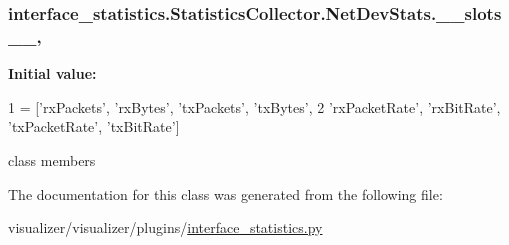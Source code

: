 \subsubsection[{\texorpdfstring{\+\_\+\+\_\+slots\+\_\+\+\_\+}{__slots__}}]{\setlength{\rightskip}{0pt plus 5cm}interface\+\_\+statistics.\+Statistics\+Collector.\+Net\+Dev\+Stats.\+\_\+\+\_\+slots\+\_\+\+\_\+\hspace{0.3cm}{\ttfamily [static]}, {\ttfamily [private]}}\hypertarget{classinterface__statistics_1_1StatisticsCollector_1_1NetDevStats_a54ce7afee917d8d3bf33fe9ba2db86bf}{}\label{classinterface__statistics_1_1StatisticsCollector_1_1NetDevStats_a54ce7afee917d8d3bf33fe9ba2db86bf}
{\bfseries Initial value\+:}
\begin{DoxyCode}
1 = [\textcolor{stringliteral}{'rxPackets'}, \textcolor{stringliteral}{'rxBytes'}, \textcolor{stringliteral}{'txPackets'}, \textcolor{stringliteral}{'txBytes'},
2                      \textcolor{stringliteral}{'rxPacketRate'}, \textcolor{stringliteral}{'rxBitRate'}, \textcolor{stringliteral}{'txPacketRate'}, \textcolor{stringliteral}{'txBitRate'}]
\end{DoxyCode}


class members 



The documentation for this class was generated from the following file\+:\begin{DoxyCompactItemize}
\item 
visualizer/visualizer/plugins/\hyperlink{interface__statistics_8py}{interface\+\_\+statistics.\+py}\end{DoxyCompactItemize}
